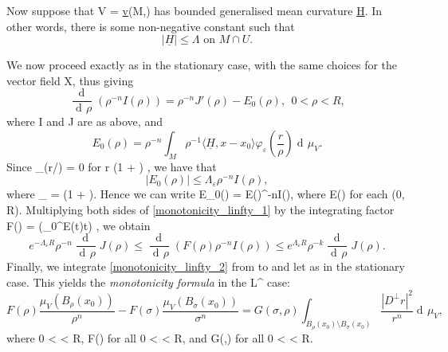 \documentclass[a4paper, 11pt]{article}
\theoremstyle{plain}
\theoremstyle{definition}
\theoremstyle{remark}
\DeclareMathOperator{\diff}{d \!}
\numberwithin{equation}{subsection}
\def\({}
\def\){}
\begin{document}
Now suppose that \(V = \underline{v}(M,\theta)\) has bounded generalised mean curvature \(\underline{H}\). In other words, there is some non-negative constant \(\Lambda\) such that
\begin{equation}
|\underline{H}| \leqslant \Lambda \text{ on } M \cap U.
\end{equation}

We now proceed exactly as in the stationary case, with the same choices for the vector field \(X\), thus giving
\begin{equation}
\label{monotonicity_linfty_1}
\frac{\!\diff}{\diff\rho}(\rho^{-n}I(\rho)) = \rho^{-n}J'(\rho) - E_{0}(\rho), \ \ 0 < \rho < R,
\end{equation}
where \(I\) and \(J\) are as above, and
\begin{equation}
E_{0}(\rho) = \rho^{-n}\int_{M}\rho^{-1}\langle \underline{H}, x - x_{0} \rangle \varphi_{\varepsilon}\left(\frac{r}{\rho}\right)\diff\mu_V.
\end{equation}
Since \(\varphi_{\varepsilon}(r/\rho) = 0\) for \(r \geqslant (1 + \varepsilon) \rho\), we have that
\begin{equation}
|E_0(\rho)| \leqslant \Lambda_{\varepsilon}\rho^{-n}I(\rho),
\end{equation}
where \(\Lambda_{\varepsilon} = (1 + \varepsilon)\Lambda\). Hence we can write \(E_0(\rho) = E(\rho)\rho^{-n}I(\rho)\), where \(E(\rho) \in [-\Lambda_{\varepsilon}, \Lambda_{\varepsilon}]\) for each \(\rho \in (0, R)\). Multiplying both sides of \eqref{monotonicity_linfty_1} by the integrating factor \(F(\rho) = \exp(\int_{0}^{\rho}E(t)\diff t) \), we obtain
\begin{equation}
\label{monotonicity_linfty_2}
e^{-\Lambda_{\varepsilon}R}\rho^{-n}\frac{\!\diff}{\diff\rho}J(\rho) \leqslant \frac{\!\diff}{\diff\rho}(F(\rho)\rho^{-n}I(\rho)) \leqslant e^{\Lambda_{\varepsilon}R}\rho^{-k}\frac{\!\diff}{\diff\rho}J(\rho).
\end{equation}
Finally, we integrate \eqref{monotonicity_linfty_2} from \(\sigma\) to \(\rho\) and let \(\varepsilon {}\) as in the stationary case. This yields the \emph{monotonicity formula} in the \(L^{\infty}\) case:
\begin{equation}
F(\rho)\frac{\mu_{V}(B_{\rho}(x_0))}{\rho^{n}} - F(\sigma)\frac{\mu_{V}(B_{\sigma}(x_0))}{\sigma^{n}} = G(\sigma,\rho)\int_{B_{\rho}(x_0) \setminus B_{\sigma}(x_0)}\frac{|D^{\perp}r|^2}{r^n} \diff \mu_V,
\end{equation}
where \(0 < \sigma \leqslant \rho < R\), \(F(\rho) \in {}\) for all \(0 < \rho < R\), and \(G(\sigma,\rho) \in {}\) for all \(0 < \sigma \leqslant \rho < R\).
\end{document}
